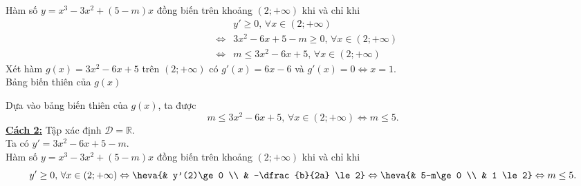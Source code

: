 \begin{vd}
{\begin{enumerate}[a)]
	Hàm số $y=x^3-3x^2+(5-m)x$ đồng biến trên khoảng $(2;+\infty)$ khi và chỉ khi
	\allowdisplaybreaks
	\begin{eqnarray*}
		&&y'\ge 0,\,\forall x\in (2;+\infty)\\
		&\Leftrightarrow& 3x^2-6x+5-m\ge 0,\,\forall x\in (2;+\infty)\\
		&\Leftrightarrow& m\le 3x^2-6x+5, \,\forall x\in (2;+\infty)
	\end{eqnarray*}
	Xét hàm $g(x)=3x^2-6x+5$ trên $(2;+\infty)$ có $g'(x)=6x-6$ và $g'(x)=0\Leftrightarrow x=1$.\\
	Bảng biến thiên của $g(x)$
	\begin{center}
	\end{center}
	Dựa vào bảng biến thiên của $g(x)$, ta được
	$$m\le 3x^2-6x+5, \,\forall x\in (2;+\infty) \Leftrightarrow m\le 5.$$
	\textbf{\underline{Cách 2:}} Tập xác định $\mathscr{D}=\mathbb{R}$.\\
	Ta có $y'=3x^2-6x+5-m$.\\
	Hàm số $y=x^3-3x^2+(5-m)x$ đồng biến trên khoảng $(2;+\infty)$ khi và chỉ khi
	$$y'\ge 0,\,\forall x\in (2;+\infty) 
	\Leftrightarrow \heva{& y'(2)\ge 0 \\ & -\dfrac{b}{2a} \le 2} 
	\Leftrightarrow \heva{& 5-m\ge 0 \\ & 1 \le 2}
	\Leftrightarrow m \le 5. $$
\end{enumerate}}
\end{vd}

